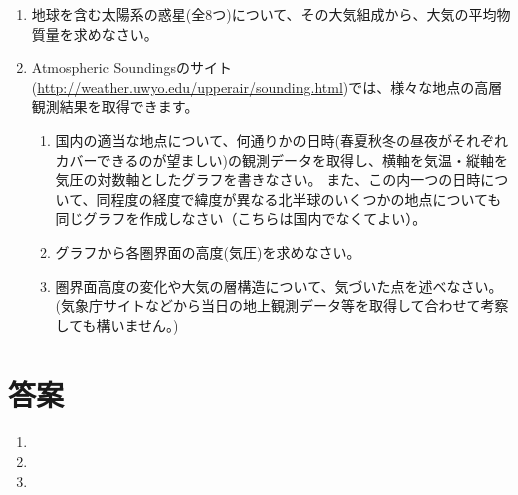 \documentclass{jsarticle}
\newenvironment{problems}
{
  \renewcommand\labelenumi{\doublebox{\arabic{enumi}}}
  \begin{enumerate}
}{
  \end{enumerate}
  \renewcommand\labelenumi{\arabic{enumi}.}
}
\begin{document}
\begin{problems}
        \begin{enumerate}[(1)]
        \item 文中の空欄(A)〜(H)に当てはまる語句や数値を答えなさい。
        \item 下線部(a)のように、(C)が緯度や年単位・日単位で変動するのは何故か説明しなさい。
        \item 下線部(b)については、エアコン等の冷媒として使われたフロンガスが原因とされますが、実際にはそれ以外の物質も多くあり、いずれも触媒の役割を果たします。
              破壊はオゾンが酸素になることにより起きますが、その化学反応式を答えなさい。
        \item 下線部(c)に関連して、この高度では一般にやけどしないが、なぜか答えなさい。
        \item 下線部(d)について、この層がどのような役割を果たして電波が遠くまで伝わるのか、その理由を述べなさい。\\
        \end{enumerate}

    \item 地球を含む太陽系の惑星(全8つ)について、その大気組成から、大気の平均物質量を求めなさい。\\

    \item Atmospheric Soundingsのサイト(\url{http://weather.uwyo.edu/upperair/sounding.html})では、様々な地点の高層観測結果を取得できます。
        \begin{enumerate}[(1)]
        \item 国内の適当な地点について、何通りかの日時(春夏秋冬の昼夜がそれぞれカバーできるのが望ましい)の観測データを取得し、横軸を気温・縦軸を気圧の対数軸としたグラフを書きなさい。
            また、この内一つの日時について、同程度の経度で緯度が異なる北半球のいくつかの地点についても同じグラフを作成しなさい（こちらは国内でなくてよい）。
        \item グラフから各圏界面の高度(気圧)を求めなさい。
        \item 圏界面高度の変化や大気の層構造について、気づいた点を述べなさい。(気象庁サイトなどから当日の地上観測データ等を取得して合わせて考察しても構いません。)
        \end{enumerate}
\end{problems}

\section{答案}
\begin{problems}
\item 

\item 

\item 

\end{problems}
\end{document}
